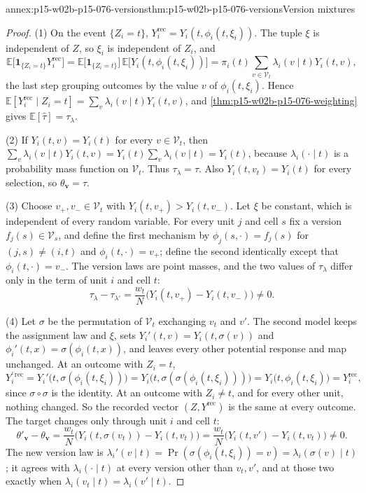 \begin{annexitem}{annex:p15-w02b-p15-076-versions}{thm:p15-w02b-p15-076-versions}{Version mixtures}
\begin{proof}
(1) On the event \(\{Z_i=t\}\),
\(Y_i^{\mathrm{rec}}=Y_i(t,\phi_i(t,\xi_i))\). The tuple \(\xi\) is
independent of \(Z\), so \(\xi_i\) is independent of \(Z_i\), and
\[
 \mathbb E\bigl[\mathbf 1_{\{Z_i=t\}}Y_i^{\mathrm{rec}}\bigr]
 =\mathbb E\bigl[\mathbf 1_{\{Z_i=t\}}\bigr]\,
  \mathbb E\bigl[Y_i(t,\phi_i(t,\xi_i))\bigr]
 =\pi_i(t)\sum_{v\in\mathcal V_t}\lambda_i(v\mid t)Y_i(t,v),
\]
the last step grouping outcomes by the value \(v\) of
\(\phi_i(t,\xi_i)\). Hence
\(\mathbb E[Y_i^{\mathrm{rec}}\mid Z_i=t]=\sum_v\lambda_i(v\mid t)Y_i(t,v)\),
and \cref{thm:p15-w02b-p15-076-weighting} gives
\(\mathbb E[\widehat\tau]=\tau_\lambda\).

(2) If \(Y_i(t,v)=Y_i(t)\) for every \(v\in\mathcal V_t\), then
\(\sum_v\lambda_i(v\mid t)Y_i(t,v)=Y_i(t)\sum_v\lambda_i(v\mid t)=Y_i(t)\),
because \(\lambda_i(\cdot\mid t)\) is a probability mass function on
\(\mathcal V_t\). Thus \(\tau_\lambda=\tau\). Also
\(Y_i(t,v_t)=Y_i(t)\) for every selection, so \(\theta_{\mathbf v}=\tau\).

(3) Choose \(v_+,v_-\in\mathcal V_t\) with
\(Y_i(t,v_+)>Y_i(t,v_-)\). Let \(\xi\) be constant, which is independent of
every random variable. For every unit \(j\) and cell \(s\) fix a version
\(f_j(s)\in\mathcal V_s\), and define the first mechanism by
\(\phi_j(s,\cdot)=f_j(s)\) for \((j,s)\ne(i,t)\) and
\(\phi_i(t,\cdot)=v_+\); define the second identically except that
\(\phi_i(t,\cdot)=v_-\). The version laws are point masses, and the two
values of \(\tau_\lambda\) differ only in the term of unit \(i\) and cell
\(t\):
\[
 \tau_\lambda-\tau_{\lambda'}=\frac{w_t}{N}\bigl(Y_i(t,v_+)-Y_i(t,v_-)\bigr)\ne0.
\]

(4) Let \(\sigma\) be the permutation of \(\mathcal V_t\) exchanging
\(v_t\) and \(v'\). The second model keeps the assignment law and \(\xi\),
sets \(Y_i'(t,v)=Y_i(t,\sigma(v))\) and
\(\phi_i'(t,x)=\sigma(\phi_i(t,x))\), and leaves every other potential
response and map unchanged. At an outcome with \(Z_i=t\),
\[
 Y_i^{\prime\,\mathrm{rec}}
 =Y_i'\bigl(t,\sigma(\phi_i(t,\xi_i))\bigr)
 =Y_i\bigl(t,\sigma(\sigma(\phi_i(t,\xi_i)))\bigr)
 =Y_i\bigl(t,\phi_i(t,\xi_i)\bigr)=Y_i^{\mathrm{rec}},
\]
since \(\sigma\circ\sigma\) is the identity. At an outcome with
\(Z_i\ne t\), and for every other unit, nothing changed. So the recorded
vector \((Z,Y^{\mathrm{rec}})\) is the same at every outcome. The target
changes only through unit \(i\) and cell \(t\):
\[
 \theta'_{\mathbf v}-\theta_{\mathbf v}
 =\frac{w_t}{N}\bigl(Y_i(t,\sigma(v_t))-Y_i(t,v_t)\bigr)
 =\frac{w_t}{N}\bigl(Y_i(t,v')-Y_i(t,v_t)\bigr)\ne0.
\]
The new version law is
\(\lambda_i'(v\mid t)=\Pr(\sigma(\phi_i(t,\xi_i))=v)=\lambda_i(\sigma(v)\mid t)\);
it agrees with \(\lambda_i(\cdot\mid t)\) at every version other than
\(v_t,v'\), and at those two exactly when
\(\lambda_i(v_t\mid t)=\lambda_i(v'\mid t)\).


\end{proof}
\end{annexitem}
